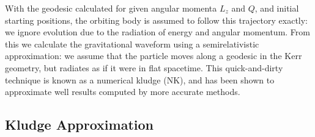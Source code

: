 With the geodesic calculated for given angular momenta $L_z$ and $Q$, and initial starting positions, the orbiting body is assumed to follow this trajectory exactly: we ignore evolution due to the radiation of energy and angular momentum. From this we calculate the gravitational waveform using a semirelativistic approximation\cite{Ruffini1981}: we assume that the particle moves along a geodesic in the Kerr geometry, but radiates as if it were in flat spacetime. This quick-and-dirty technique is known as a numerical kludge (NK), and has been shown to approximate well results computed by more accurate methods\cite{Babak2007}.

\subsection{Kludge Approximation}

